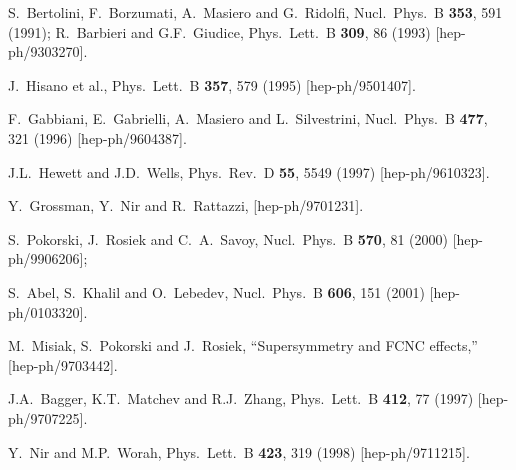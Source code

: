 \documentclass[11pt]{article}
\begin{document}
\begin{thebibliography}{999}
S.~Bertolini, F.~Borzumati, A.~Masiero and G.~Ridolfi,
  Nucl.\ Phys.\ B {\bf 353}, 591 (1991);
R.~Barbieri and G.F.~Giudice,
  Phys.\ Lett.\ B {\bf 309}, 86 (1993)
  [hep-ph/9303270].

J.~Hisano et al., 
  Phys.\ Lett.\ B {\bf 357}, 579 (1995)
  [hep-ph/9501407].

F.~Gabbiani, E.~Gabrielli, A.~Masiero and L.~Silvestrini, 
  Nucl.\ Phys.\ B {\bf 477}, 321 (1996)
  [hep-ph/9604387].

J.L.~Hewett and J.D.~Wells,
  Phys.\ Rev.\ D {\bf 55}, 5549 (1997)
  [hep-ph/9610323].

Y.~Grossman, Y.~Nir and R.~Rattazzi,
  [hep-ph/9701231].

S.~Pokorski, J.~Rosiek and C.~A.~Savoy,
  Nucl.\ Phys.\ B {\bf 570}, 81 (2000)
  [hep-ph/9906206];

S.~Abel, S.~Khalil and O.~Lebedev,
  Nucl.\ Phys.\ B {\bf 606}, 151 (2001)
  [hep-ph/0103320].

  M.~Misiak, S.~Pokorski and J.~Rosiek,
  ``Supersymmetry and FCNC effects,''
  [hep-ph/9703442].

  J.A.~Bagger, K.T.~Matchev and R.J.~Zhang,
  Phys.\ Lett.\ B {\bf 412}, 77 (1997)
  [hep-ph/9707225].

  Y.~Nir and M.P.~Worah,
  Phys.\ Lett.\ B {\bf 423}, 319 (1998)
  [hep-ph/9711215].


\end{thebibliography}
\end{document}
